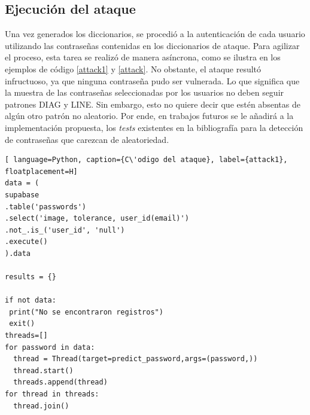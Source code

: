 \subsection{Ejecuci\'on del ataque}


Una vez generados los diccionarios, se procedió a la autenticación de cada usuario utilizando las contraseñas contenidas en los diccionarios de ataque. Para agilizar el proceso, esta tarea se realizó de manera asíncrona, como se ilustra en los ejemplos de código \ref{attack1} y \ref{attack}. No obstante, el ataque resultó infructuoso, ya que ninguna contraseña pudo ser vulnerada. Lo que significa que la muestra de las contrase\~nas seleccionadas por los usuarios no deben seguir patrones DIAG y LINE. Sin embargo, esto no quiere decir que est\'en absentas de alg\'un otro patr\'on no aleatorio. Por ende, en trabajos futuros se le a\~nadir\'a a la implementaci\'on propuesta, los \textit{tests} existentes en la bibliograf\'ia para la detecci\'on de contrase\~nas que carezcan de aleatoriedad.
\bigskip\bigskip
\begin{lstlisting}[ language=Python, caption={C\'odigo del ataque}, label={attack1}, floatplacement=H]
data = (
supabase
.table('passwords')
.select('image, tolerance, user_id(email)')
.not_.is_('user_id', 'null')
.execute()
).data

results = {}

if not data:
 print("No se encontraron registros")
 exit()
threads=[]
for password in data:
  thread = Thread(target=predict_password,args=(password,))
  thread.start()
  threads.append(thread)
for thread in threads:
  thread.join()
\end{lstlisting}

\clearpage

